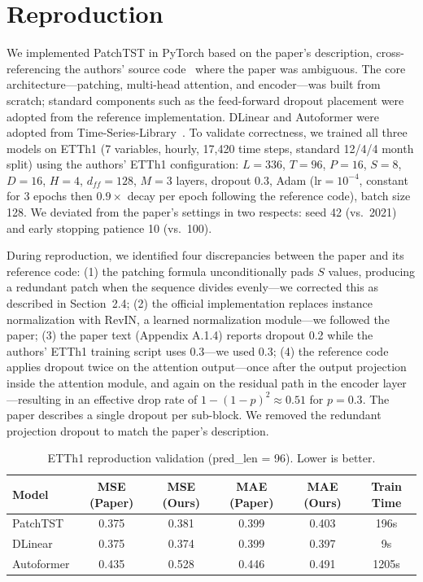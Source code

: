 \documentclass[11pt]{article}
\begin{document}
\section{Reproduction}

We implemented PatchTST in PyTorch based on the paper's description, cross-referencing the authors' source code~\cite{patchtst_github} where the paper was ambiguous. The core architecture---patching, multi-head attention, and encoder---was built from scratch; standard components such as the feed-forward dropout placement were adopted from the reference implementation. DLinear and Autoformer were adopted from Time-Series-Library~\cite{time_series_library}. To validate correctness, we trained all three models on ETTh1 (7 variables, hourly, 17,420 time steps, standard 12/4/4 month split) using the authors' ETTh1 configuration: $L{=}336$, $T{=}96$, $P{=}16$, $S{=}8$, $D{=}16$, $H{=}4$, $d_{ff}{=}128$, $M{=}3$ layers, dropout 0.3, Adam ($\text{lr}{=}10^{-4}$, constant for 3 epochs then $0.9\times$ decay per epoch following the reference code), batch size 128. We deviated from the paper's settings in two respects: seed 42 (vs.\ 2021) and early stopping patience 10 (vs.\ 100).

During reproduction, we identified four discrepancies between the paper and its reference code: (1) the patching formula unconditionally pads $S$ values, producing a redundant patch when the sequence divides evenly---we corrected this as described in Section~2.4; (2) the official implementation replaces instance normalization with RevIN, a learned normalization module---we followed the paper; (3) the paper text (Appendix A.1.4) reports dropout 0.2 while the authors' ETTh1 training script uses 0.3---we used 0.3; (4) the reference code applies dropout twice on the attention output---once after the output projection inside the attention module, and again on the residual path in the encoder layer---resulting in an effective drop rate of $1-(1-p)^2 \approx 0.51$ for $p{=}0.3$. The paper describes a single dropout per sub-block. We removed the redundant projection dropout to match the paper's description.

\begin{table}[h]
\centering
\caption{ETTh1 reproduction validation (pred\_len = 96). Lower is better.}
\label{tab:results}
\begin{tabular}{lccccc}
\toprule
Model & MSE (Paper) & MSE (Ours) & MAE (Paper) & MAE (Ours) & Train Time \\
\midrule
PatchTST   & 0.375 & 0.381 & 0.399 & 0.403 & 196s \\
DLinear    & 0.375 & 0.374 & 0.399 & 0.397 & 9s \\
Autoformer & 0.435 & 0.528 & 0.446 & 0.491 & 1205s \\
\bottomrule
\end{tabular}
\end{table}
\end{document}
